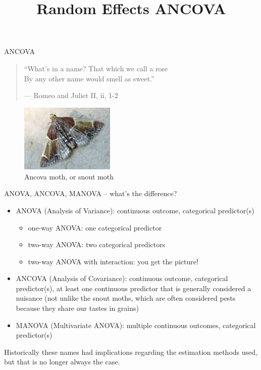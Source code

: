 \documentclass[ignorenonframetext,]{beamer}
\title{Random Effects ANCOVA}
\date{}
\providecommand{\tightlist}{%
  \setlength{\itemsep}{0pt}\setlength{\parskip}{0pt}}
\begin{document}
\frame{\titlepage}

\begin{frame}{ANCOVA}

\begin{quote}
``What's in a name? That which we call a rose\\
By any other name would smell as sweet.''

\hfill --- Romeo and Juliet II, ii, 1-2
\end{quote}

\begin{figure}
\centering
\includegraphics[width=0.40000\textwidth]{figures/ancovamoth.jpg}
\caption{Ancova moth, or snout moth}
\end{figure}

ANOVA, ANCOVA, MANOVA -- what's the difference?

\end{frame}

\begin{frame}{}

\begin{itemize}
\item
  ANOVA (Analysis of Variance): continuous outcome, categorical
  predictor(s)

  \begin{itemize}
  \tightlist
  \item
    one-way ANOVA: one categorical predictor
  \item
    two-way ANOVA: two categorical predictors
  \item
    two-way ANOVA with interaction: you get the picture!
  \end{itemize}
\item
  ANCOVA (Analysis of Covariance): continuous outcome, categorical
  predictor(s), at least one continuous predictor that is generally
  considered a nuisance (not unlike the snout moths, which are often
  considered pests because they share our tastes in grains)
\item
  MANOVA (Multivariate ANOVA): multiple continuous outcomes, categorical
  predictor(s)
\end{itemize}

Historically these names had implications regarding the estimation
methods used, but that is no longer always the case.

\end{frame}
\end{document}
